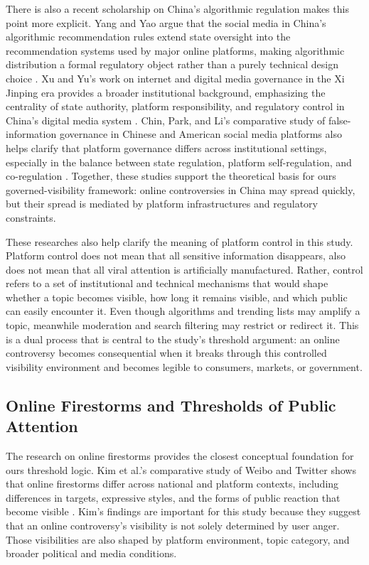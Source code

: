 \documentclass[conference]{IEEEtran}
\begin{document}
There is also a recent scholarship on China's algorithmic regulation makes this point more explicit. Yang and Yao argue that the social media in China's algorithmic recommendation rules extend state oversight into the recommendation systems used by major online platforms, making algorithmic distribution a formal regulatory object rather than a purely technical design choice \cite{yang2022algorithmic}. Xu and Yu's work on internet and digital media governance in the Xi Jinping era provides a broader institutional background, emphasizing the centrality of state authority, platform responsibility, and regulatory control in China's digital media system \cite{xu2022regulating}. Chin, Park, and Li's comparative study of false-information governance in Chinese and American social media platforms also helps clarify that platform governance differs across institutional settings, especially in the balance between state regulation, platform self-regulation, and co-regulation \cite{chin2022falseinfo}. Together, these studies support the theoretical basis for ours governed-visibility framework: online controversies in China may spread quickly, but their spread is mediated by platform infrastructures and regulatory constraints.

These researches also help clarify the meaning of platform control in this study. Platform control does not mean that all sensitive information disappears, also does not mean that all viral attention is artificially manufactured. Rather, control refers to a set of institutional and technical mechanisms that would shape whether a topic becomes visible, how long it remains visible, and which public can easily encounter it. Even though algorithms and trending lists may amplify a topic, meanwhile moderation and search filtering may restrict or redirect it. This is a dual process that is central to the study's threshold argument: an online controversy becomes consequential when it breaks through this controlled visibility environment and becomes legible to consumers, markets, or government.

\subsection{Online Firestorms and Thresholds of Public Attention}

The research on online firestorms provides the closest conceptual foundation for ours threshold logic. Kim et al.'s comparative study of Weibo and Twitter shows that online firestorms differ across national and platform contexts, including differences in targets, expressive styles, and the forms of public reaction that become visible \cite{kim2021firestorms}. Kim's findings are important for this study because they suggest that an online controversy's visibility is not solely determined by user anger. Those visibilities are also shaped by platform environment, topic category, and broader political and media conditions.
\end{document}
